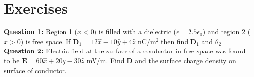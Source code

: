 \documentclass[12pt,a4paper]{article}
\begin{document}
\section{Exercises}
\noindent\textbf{Question 1:} Region 1 ($x<0$) is filled with a dielectric ($\epsilon=2.5\epsilon_0$) and region 2 ($x>0$) is free space. If $\mathrm{\textbf {D$_1$}}=12\hat x-10\hat y+4\hat z$ nC/m$^2$ then find $\mathrm{\textbf {D$_1$}}$ and $\theta_2$.\\[0.2cm]
\noindent\textbf{Question 2:} Electric field at the surface of a conductor in free space was found to be $\mathrm{\textbf{E}}=60\hat x+20\hat y-30\hat z$ mV/m. Find \textbf{D} and the surface charge density on surface of conductor.
%
%
\end{document}
